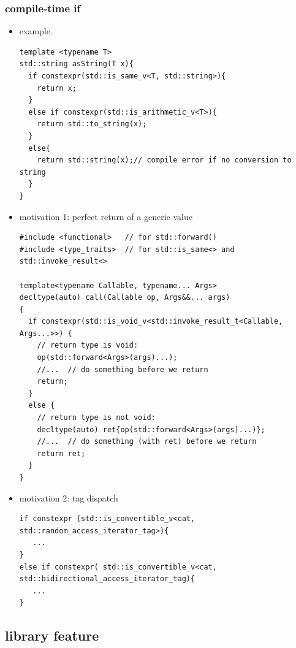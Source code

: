 \documentclass[a4paper,11pt,twoside]{book}
\begin{document}
\subsubsection{compile-time if}
\begin{itemize}
		\item example.
\begin{lstlisting}
template <typename T>
std::string asString(T x){
  if constexpr(std::is_same_v<T, std::string>){
    return x;
  }
  else if constexpr(std::is_arithmetic_v<T>){
    return std::to_string(x);
  }
  else{
    return std::string(x);// compile error if no conversion to string
  }
}
\end{lstlisting}
		\item motivation 1: perfect return of a generic value
\begin{lstlisting}
#include <functional>   // for std::forward()
#include <type_traits>  // for std::is_same<> and std::invoke_result<>

template<typename Callable, typename... Args>
decltype(auto) call(Callable op, Args&&... args)
{
  if constexpr(std::is_void_v<std::invoke_result_t<Callable, Args...>>) {
    // return type is void:
    op(std::forward<Args>(args)...);
    //...  // do something before we return
    return;
  }
  else {
    // return type is not void:
    decltype(auto) ret{op(std::forward<Args>(args)...)};
    //...  // do something (with ret) before we return
    return ret;
  }
}
\end{lstlisting}
\item motivation 2: tag dispatch
\begin{lstlisting}
if constexpr (std::is_convertible_v<cat, std::random_access_iterator_tag>){
   ...
}
else if constexpr( std::is_convertible_v<cat, std::bidirectional_access_iterator_tag){
   ...
}
\end{lstlisting}

\end{itemize}


\subsection{library feature}
\end{document}
